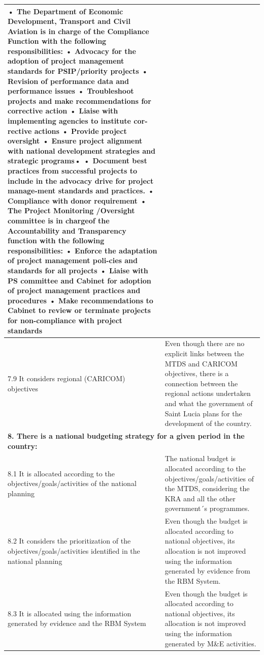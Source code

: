 \documentclass[
  10pt,
]{book}
\begin{document}
\begin{table}
\begin{tabular}[t]{l|l}
•   The Department of Economic Development, Transport and Civil Aviation is in charge of the Compliance Function with the following responsibilities:
• Advocacy for the adoption of project management standards for PSIP/priority projects  
• Revision of performance data and performance issues   
• Troubleshoot projects and make recommendations for corrective action  
• Liaise with implementing agencies to institute cor-rective actions    
• Provide project oversight 
• Ensure project alignment with national development strategies and strategic programs•         
• Document best practices from successful projects to include in the advocacy drive for project manage-ment standards and practices.    
• Compliance with donor requirement 
•   The Project Monitoring /Oversight committee is in chargeof the Accountability and Transparency function with the following responsibilities:
• Enforce the adaptation of project management poli-cies and standards for all projects 
• Liaise with PS committee and Cabinet for adoption of project management practices and procedures  
\hspace{1em}• Make recommendations to Cabinet to review or terminate projects for non-compliance with project standards\\
\hline
\hspace{1em}7.9 It considers regional (CARICOM) objectives & Even though there are no explicit links between the MTDS and CARICOM objectives, there is a connection between the regional actions undertaken and what the government of Saint Lucia plans for the development of the country.\\
\hline
\multicolumn{2}{l}{\textbf{8. There is a national budgeting strategy for a given period in the country:}}\\
\hline
\hspace{1em}8.1 It is allocated according to the objectives/goals/activities of the national planning & The national budget is allocated according to the objectives/goals/activities of the MTDS, considering the KRA and all the other government´s programmes.\\
\hline
\hspace{1em}8.2 It considers the prioritization of the objectives/goals/activities identified in the national planning & Even though the budget is allocated according to national objectives, its allocation is not improved using the information generated by evidence from the RBM System.\\
\hline
\hspace{1em}8.3 It is allocated using the information generated by evidence and the RBM System & Even though the budget is allocated according to national objectives, its allocation is not improved using the information generated by M\&E activities.\\

\end{tabular}
\end{table}
\end{document}
